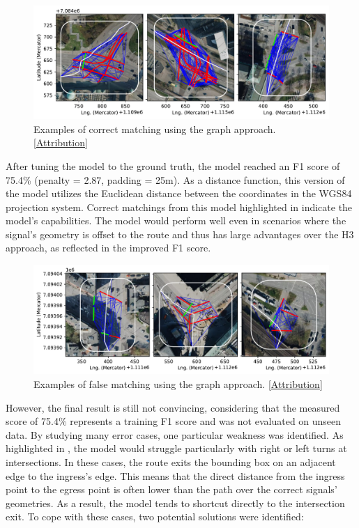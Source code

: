 \begin{figure}[htbp]
\centering
\includegraphics[width=\linewidth]{images/matching-dijkstra-correct.pdf}
\caption{Examples of correct matching using the graph approach. [\hyperref[attribution]{Attribution}]}
\label{fig:sg-selection-graph-example}
\end{figure}

After tuning the model to the ground truth, the model reached an F1 score of 75.4\% (penalty = 2.87, padding = 25m). As a distance function, this version of the model utilizes the Euclidean distance between the coordinates in the WGS84 projection system. Correct matchings from this model highlighted in  indicate the model's capabilities. The model would perform well even in scenarios where the signal's geometry is offset to the route and thus has large advantages over the H3 approach, as reflected in the improved F1 score.

\begin{figure}[htbp]
\centering
\includegraphics[width=\linewidth]{images/matching-dijkstra-incorrect.pdf}
\caption{Examples of false matching using the graph approach. [\hyperref[attribution]{Attribution}]}
\label{fig:sg-selection-graph-fails}
\end{figure}

However, the final result is still not convincing, considering that the measured score of 75.4\% represents a training F1 score and was not evaluated on unseen data. By studying many error cases, one particular weakness was identified. As highlighted in , the model would struggle particularly with right or left turns at intersections. In these cases, the route exits the bounding box on an adjacent edge to the ingress's edge. This means that the direct distance from the ingress point to the egress point is often lower than the path over the correct signals' geometries. As a result, the model tends to shortcut directly to the intersection exit. To cope with these cases, two potential solutions were identified:


